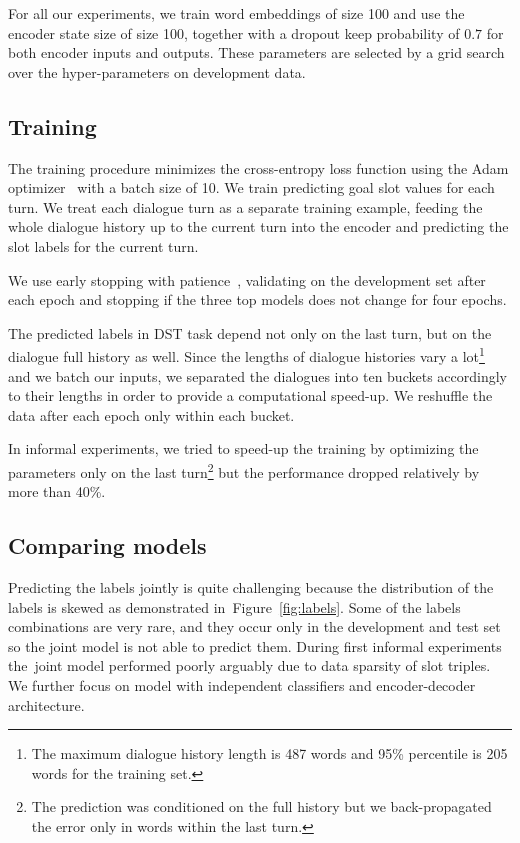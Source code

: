 \documentclass{itatnew}
\begin{document}
For all our experiments, we train word embeddings of size 100 and use the encoder state size of size 100, together with a dropout keep probability of $0.7$ for both encoder inputs and outputs.
These parameters are selected by a grid search over the hyper-parameters on development data.

\subsection{Training}
\label{sec:train}
The training procedure minimizes the cross-entropy loss function using the Adam optimizer~\cite{kingma2014adam} with a batch size of 10.
We train predicting goal slot values for each turn.
We treat each dialogue turn as a separate training example, feeding the whole dialogue history up to the current turn into the encoder and predicting the slot labels for the current turn.

We use early stopping with patience~\cite{prechelt1998early}, validating on the development set after each epoch and stopping if the three top models does not change for four epochs.

The predicted labels in DST task depend not only on the last turn, but on the dialogue full history as well.
Since the lengths of dialogue histories vary a lot\footnote{The maximum dialogue history length is 487 words and 95\% percentile is 205 words for the training set.} and we batch our inputs, we separated the dialogues into ten buckets accordingly to their lengths in order to provide a computational speed-up. We reshuffle the data after each epoch only within each bucket.

In informal experiments, we tried to speed-up the training by  optimizing the parameters only on the last turn\footnote{The prediction was conditioned on the full history but we back-propagated the error only in words within the last turn.} but the performance dropped relatively by more than 40\%.

\subsection{Comparing models}
\label{sec:eval}

Predicting the labels jointly is quite challenging because the distribution of the labels is skewed as demonstrated in~Figure~\ref{fig:labels}.
Some of the labels combinations are very rare, and they occur only in the development and test set so the joint model is not able to predict them.
During first informal experiments the~joint model performed poorly arguably due to data sparsity of slot triples. We further focus on model with independent classifiers and encoder-decoder architecture.
\end{document}
